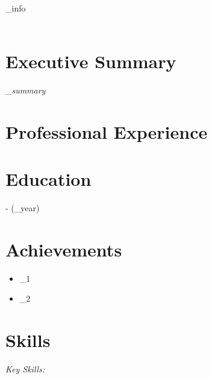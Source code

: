 \documentclass[a4paper,10pt]{article}
\begin{document}
\begin{center}
    \Huge{{\textbf{{\name}}}} \\
    \small{{\contact_info}} \\
    \small{{\email}} \\
\end{center}

\vspace{0.4cm}

\section*{Executive Summary}
\textit{{\executive_summary}}

\vspace{0.4cm}

\section*{Professional Experience}

\vspace{0.3cm}

\section*{Education}
\textbf{{\degree}} - {{\institution}} ({{\grad_year}})

\vspace{0.3cm}

\section*{Achievements}
\begin{itemize}[leftmargin=*]
    \item {{\achievement_1}}
    \item {{\achievement_2}}
\end{itemize}

\vspace{0.3cm}

\section*{Skills}
\textit{Key Skills:} {{\skills}}
\end{document}
